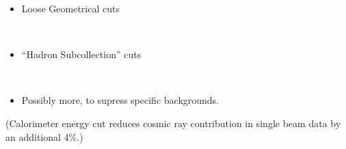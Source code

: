 \begin{slide*}

\slideframe{}
\huge
{}

\begin{minipage}[t]{\linewidth}
\LARGE

\begin{itemize}
  \item Loose Geometrical cuts

\begin{center}
   \\
\end{center}

  \item ``Hadron Subcollection'' cuts

\begin{center}
   \\
\end{center}

  \item Possibly more, to supress specific backgrounds.

\end{itemize}

\vspace{0.5 in}

(Calorimeter energy cut reduces cosmic ray contribution in single beam
data by an additional 4\%.)

\end{minipage}

\end{slide*}


